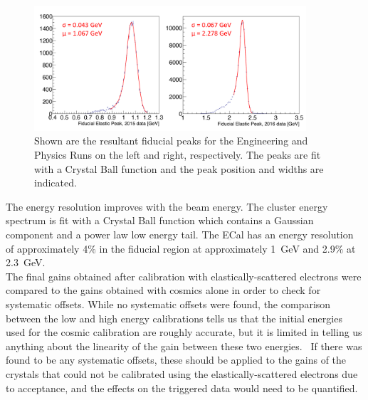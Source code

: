 \begin{figure}[H]
  \centering
      \includegraphics[width=0.9\textwidth]{pics/performance/feePeakFid.png}
  \caption[Reconstructed elastic peak in the ECal for the Engineering and Physics Runs]{Shown are the resultant fiducial peaks for the Engineering and Physics Runs on the left and right, respectively. The peaks are fit with a Crystal Ball function and the peak position and widths are indicated. }
  \label{Figure:FeeFidPeak}
\end{figure}

The energy resolution improves with the beam energy. The cluster energy spectrum is fit with a Crystal Ball function which contains a Gaussian component and a power law low energy tail. The ECal has an energy resolution of approximately 4$\%$ in the fiducial region at approximately 1~GeV and 2.9$\%$ at 2.3~GeV. \\
\indent The final gains obtained after calibration with elastically-scattered electrons were compared to the gains obtained with cosmics alone in order to check for systematic offsets. While no systematic offsets were found, the comparison between the low and high energy calibrations tells us that the initial energies used for the cosmic calibration are roughly accurate, but it is limited in telling us anything about the linearity of the gain between these two energies.~\cite{szumila-vance_hps_2016} If there was found to be any systematic offsets, these should be applied to the gains of the crystals that could not be calibrated using the elastically-scattered electrons due to acceptance, and the effects on the triggered data would need to be quantified. 

